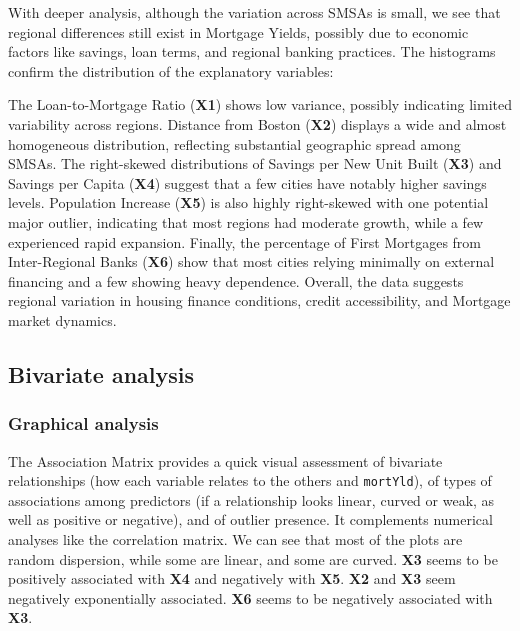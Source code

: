 \documentclass[
  12pt,
]{article}
\begin{document}
With deeper analysis, although the variation across SMSAs is small, we
see that regional differences still exist in Mortgage Yields, possibly
due to economic factors like savings, loan terms, and regional banking
practices. The histograms confirm the distribution of the explanatory
variables:

The Loan-to-Mortgage Ratio (\textbf{X1}) shows low variance, possibly
indicating limited variability across regions. Distance from Boston
(\textbf{X2}) displays a wide and almost homogeneous distribution,
reflecting substantial geographic spread among SMSAs. The right-skewed
distributions of Savings per New Unit Built (\textbf{X3}) and Savings
per Capita (\textbf{X4}) suggest that a few cities have notably higher
savings levels. Population Increase (\textbf{X5}) is also highly
right-skewed with one potential major outlier, indicating that most
regions had moderate growth, while a few experienced rapid expansion.
Finally, the percentage of First Mortgages from Inter-Regional Banks
(\textbf{X6}) show that most cities relying minimally on external
financing and a few showing heavy dependence. Overall, the data suggests
regional variation in housing finance conditions, credit accessibility,
and Mortgage market dynamics.

\subsection{Bivariate analysis}\label{bivariate-analysis}

\subsubsection{Graphical analysis}\label{graphical-analysis-1}

The Association Matrix provides a quick visual assessment of bivariate
relationships (how each variable relates to the others and
\texttt{mortYld}), of types of associations among predictors (if a
relationship looks linear, curved or weak, as well as positive or
negative), and of outlier presence. It complements numerical analyses
like the correlation matrix. We can see that most of the plots are
random dispersion, while some are linear, and some are curved.
\textbf{X3} seems to be positively associated with \textbf{X4} and
negatively with \textbf{X5}. \textbf{X2} and \textbf{X3} seem negatively
exponentially associated. \textbf{X6} seems to be negatively associated
with \textbf{X3}.
\end{document}
